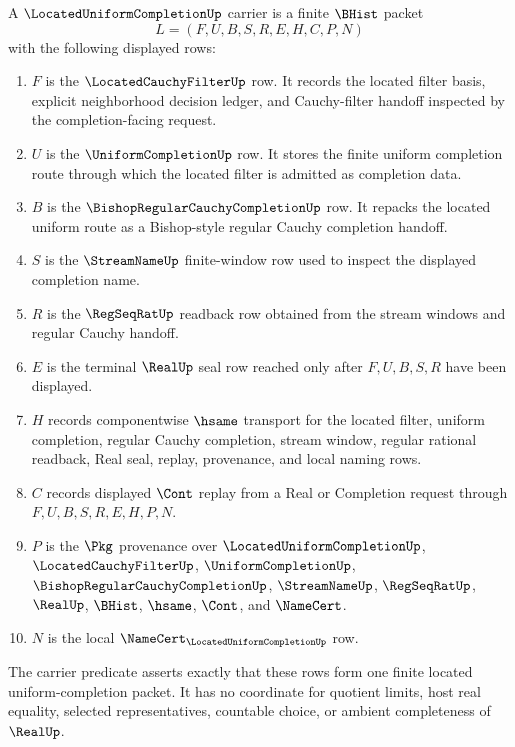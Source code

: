 \begin{definition}\label{def:located-uniform-completion-carrier}
A $\LocatedUniformCompletionUp$ carrier is a finite $\BHist$ packet
$$
L=(F,U,B,S,R,E,H,C,P,N)
$$
with the following displayed rows:
\begin{enumerate}
\item $F$ is the $\LocatedCauchyFilterUp$ row. It records the located filter basis, explicit neighborhood decision ledger, and Cauchy-filter handoff inspected by the completion-facing request.
\item $U$ is the $\UniformCompletionUp$ row. It stores the finite uniform completion route through which the located filter is admitted as completion data.
\item $B$ is the $\BishopRegularCauchyCompletionUp$ row. It repacks the located uniform route as a Bishop-style regular Cauchy completion handoff.
\item $S$ is the $\StreamNameUp$ finite-window row used to inspect the displayed completion name.
\item $R$ is the $\RegSeqRatUp$ readback row obtained from the stream windows and regular Cauchy handoff.
\item $E$ is the terminal $\RealUp$ seal row reached only after $F,U,B,S,R$ have been displayed.
\item $H$ records componentwise $\hsame$ transport for the located filter, uniform completion, regular Cauchy completion, stream window, regular rational readback, Real seal, replay, provenance, and local naming rows.
\item $C$ records displayed $\Cont$ replay from a Real or Completion request through $F,U,B,S,R,E,H,P,N$.
\item $P$ is the $\Pkg$ provenance over $\LocatedUniformCompletionUp$, $\LocatedCauchyFilterUp$, $\UniformCompletionUp$, $\BishopRegularCauchyCompletionUp$, $\StreamNameUp$, $\RegSeqRatUp$, $\RealUp$, $\BHist$, $\hsame$, $\Cont$, and $\NameCert$.
\item $N$ is the local $\NameCert_{\LocatedUniformCompletionUp}$ row.
\end{enumerate}
The carrier predicate asserts exactly that these rows form one finite located uniform-completion packet. It has no coordinate for quotient limits, host real equality, selected representatives, countable choice, or ambient completeness of $\RealUp$.
\end{definition}

